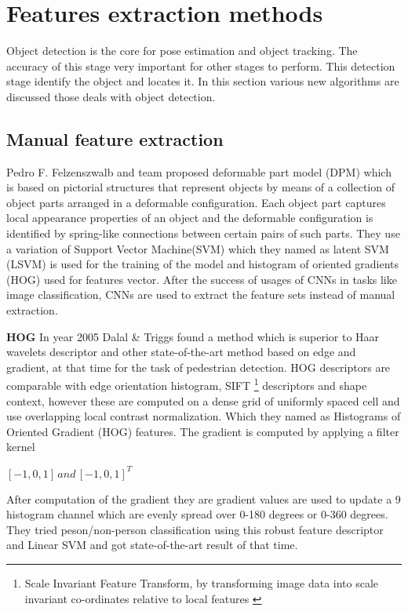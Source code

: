 \section{Features extraction methods}
Object detection is the core for pose estimation and object tracking. The accuracy of this stage very important for other stages to perform. This detection stage identify the object and locates it. In this section various new algorithms are discussed those deals with object detection.
\subsection{Manual feature extraction}
Pedro F. Felzenszwalb and team proposed deformable part model (DPM) \cite{felzenszwalb2009object} which is based on pictorial structures that represent objects by means of a collection of object parts arranged in a deformable configuration. Each object part captures local appearance properties of
an object and the deformable configuration is identified by spring-like connections between certain pairs of such parts. They use a variation of Support Vector Machine(SVM) which they named as latent SVM (LSVM) is used for the training of the model and  histogram of oriented gradients (HOG) used for features vector. After the success of usages of CNNs in tasks like image classification, CNNs are used to extract the feature sets instead of manual extraction.

\newpara \textbf{HOG }
In year 2005 Dalal \& Triggs found a method which is superior to Haar wavelets descriptor and other state-of-the-art method based on edge and gradient, at that time for the task of pedestrian detection. HOG descriptors are comparable with edge orientation histogram, SIFT \footnote{Scale Invariant Feature Transform, by transforming image data into scale invariant co-ordinates relative to local features \cite{lowe2004distinctive}} descriptors and shape context, however these are computed on a dense grid of uniformly spaced cell and use overlapping local contrast normalization. Which they named as Histograms of Oriented Gradient (HOG) features\cite{dalal2005histograms}. The gradient is computed by applying a filter kernel \\
\begin{center}
$[-1,0,1] \, and \, [-1,0,1] ^{T}$
\end{center}

\newpara After computation of the gradient they are gradient values are used to update a 9 histogram channel which are evenly spread over 0-180 degrees or 0-360 degrees. They tried peson/non-person classification using this robust feature descriptor and Linear SVM and got state-of-the-art result of that time.

